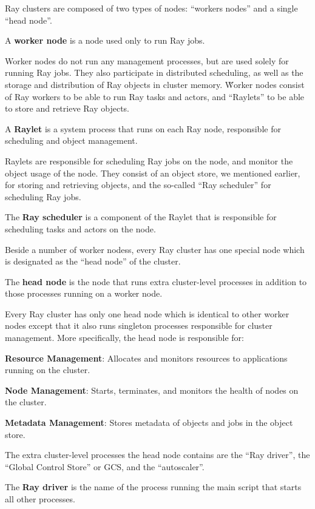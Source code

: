 Ray clusters are composed of two types of nodes: ``workers nodes'' and a single ``head node''.

A \textbf{worker node} is a node used only to run Ray jobs.
\ed

Worker nodes do not run any management processes, but are used solely for running Ray jobs. They also participate in
distributed scheduling, as well as the storage and distribution of Ray objects in cluster memory. \v

Worker nodes consist of Ray workers to be able to run Ray tasks and actors, and ``Raylets'' to be able to store and
retrieve Ray objects.

\bd[Raylet]
A \textbf{Raylet} is a system process that runs on each Ray node, responsible for scheduling and object management.
\ed

Raylets are responsible for scheduling Ray jobs on the node, and monitor the object usage of the node. They consist
of an object store, we mentioned earlier, for storing and retrieving objects, and the so-called ``Ray scheduler''
for scheduling Ray jobs.

The \textbf{Ray scheduler} is a component of the Raylet that is responsible for scheduling tasks and actors on the
node.
\ed

Beside a number of worker nodess, every Ray cluster has one special node which is designated as the ``head node'' of
the cluster.

The \textbf{head node} is the node that runs extra cluster-level processes in addition to those processes running on a
worker node.
\ed

Every Ray cluster has only one head node which is identical to other worker nodes except that it also runs singleton
processes responsible for cluster management. More specifically, the head node is responsible for:
\bit
\item \textbf{Resource Management}: Allocates and monitors resources to applications running on the cluster.
\item \textbf{Node Management}: Starts, terminates, and monitors the health of nodes on the cluster.
\item \textbf{Metadata Management}: Stores metadata of objects and jobs in the object store.
\eit

The extra cluster-level processes the head node contains are the ``Ray driver'', the ``Global Control Store'' or GCS,
and the ``autoscaler''.

The \textbf{Ray driver} is the name of the process running the main script that starts all other processes.
\ed

